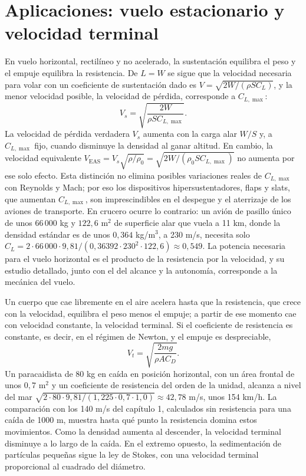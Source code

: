 \documentclass[10pt,openany]{book}
\begin{document}
\section{Aplicaciones: vuelo estacionario y velocidad terminal}

En vuelo horizontal, rectilíneo y no acelerado, la sustentación equilibra el peso y el empuje equilibra la resistencia. De \(L = W\) se sigue que la velocidad necesaria para volar con un coeficiente de sustentación dado es \(V = \sqrt{2W/(\rho S C_L)}\), y la menor velocidad posible, la velocidad de pérdida, corresponde a \(C_{L,\max}\):
\begin{equation}
V_s = \sqrt{\frac{2W}{\rho S C_{L,\max}}}. \label{eq:c07-perdida}
\end{equation}
La velocidad de pérdida verdadera \(V_s\) aumenta con la carga alar \(W/S\) y, a \(C_{L,\max}\) fijo, cuando disminuye la densidad al ganar altitud. En cambio, la velocidad equivalente \(V_{\mathrm{EAS}}=V_s\sqrt{\rho/\rho_0}=\sqrt{2W/(\rho_0 S C_{L,\max})}\) no aumenta por ese solo efecto. Esta distinción no elimina posibles variaciones reales de \(C_{L,\max}\) con Reynolds y Mach; por eso los dispositivos hipersustentadores, flaps y slats, que aumentan \(C_{L,\max}\), son imprescindibles en el despegue y el aterrizaje de los aviones de transporte. En crucero ocurre lo contrario: un avión de pasillo único de unos \(66\,000\) kg y \(122{,}6\) m\(^2\) de superficie alar que vuela a 11 km, donde la densidad estándar es de unos \(0{,}364\) kg/m\(^3\), a 230 m/s, necesita solo \(C_L = 2\cdot 66\,000\cdot 9{,}81/(0{,}36392\cdot 230^{2}\cdot 122{,}6) \approx 0{,}549\). La potencia necesaria para el vuelo horizontal es el producto de la resistencia por la velocidad, y su estudio detallado, junto con el del alcance y la autonomía, corresponde a la mecánica del vuelo.

Un cuerpo que cae libremente en el aire acelera hasta que la resistencia, que crece con la velocidad, equilibra el peso menos el empuje; a partir de ese momento cae con velocidad constante, la velocidad terminal. Si el coeficiente de resistencia es constante, es decir, en el régimen de Newton, y el empuje es despreciable,
\begin{equation}
V_t = \sqrt{\frac{2 m g}{\rho A C_D}}. \label{eq:c07-terminal}
\end{equation}
Un paracaidista de 80 kg en caída en posición horizontal, con un área frontal de unos \(0{,}7\) m\(^2\) y un coeficiente de resistencia del orden de la unidad, alcanza a nivel del mar \(\sqrt{2\cdot 80\cdot 9{,}81/(1{,}225\cdot 0{,}7\cdot 1{,}0)} \approx 42{,}78\) m/s, unos 154 km/h. La comparación con los 140 m/s del capítulo 1, calculados sin resistencia para una caída de 1000 m, muestra hasta qué punto la resistencia domina estos movimientos. Como la densidad aumenta al descender, la velocidad terminal disminuye a lo largo de la caída. En el extremo opuesto, la sedimentación de partículas pequeñas sigue la ley de Stokes, con una velocidad terminal proporcional al cuadrado del diámetro.
\end{document}
